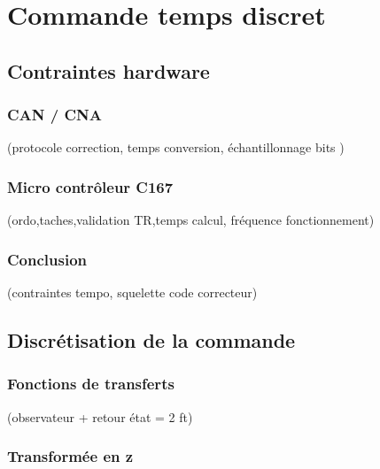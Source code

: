\chapter{Commande temps discret}

\section{Contraintes hardware} 
	\subsection{CAN / CNA}
		(protocole correction, temps conversion, échantillonnage bits )
	\subsection{Micro contrôleur C167}
		(ordo,taches,validation TR,temps calcul, fréquence fonctionnement)
	\subsection{Conclusion}
	  	(contraintes tempo, squelette code correcteur)
\section{Discrétisation de la commande}
	\subsection{Fonctions de transferts}
		 (observateur + retour état = 2 ft)
	\subsection{Transformée en z}
